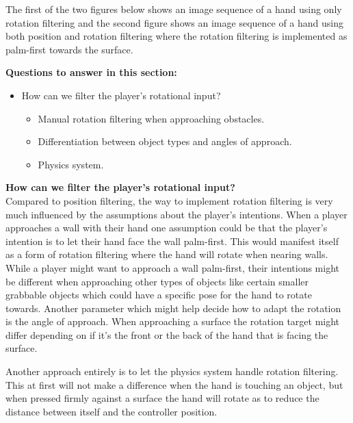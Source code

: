 The first of the two figures below shows an image sequence of a hand using only rotation filtering and the second figure shows an image sequence of a hand using both position and rotation filtering where the rotation filtering is implemented as palm-first towards the surface.


\textbf{Questions to answer in this section:}
\begin{itemize}
\item How can we filter the player's rotational input?
\begin{itemize}
\item Manual rotation filtering when approaching obstacles.
\item Differentiation between object types and angles of approach.
\item Physics system.
\end{itemize}
\end{itemize}

\textbf{How can we filter the player's rotational input?}\\
Compared to position filtering, the way to implement rotation filtering is very much influenced by the assumptions about the player's intentions. When a player approaches a wall with their hand one assumption could be that the player's intention is to let their hand face the wall palm-first. This would manifest itself as a form of rotation filtering where the hand will rotate when nearing walls. While a player might want to approach a wall palm-first, their intentions might be different when approaching other types of objects like certain smaller grabbable objects which could have a specific pose for the hand to rotate towards. Another parameter which might help decide how to adapt the rotation is the angle of approach. When approaching a surface the rotation target might differ depending on if it's the front or the back of the hand that is facing the surface.

Another approach entirely is to let the physics system handle rotation filtering. This at first will not make a difference when the hand is touching an object, but when pressed firmly against a surface the hand will rotate as to reduce the distance between itself and the controller position.

